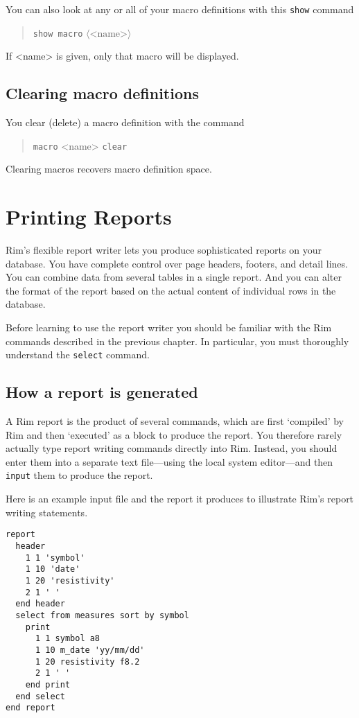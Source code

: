 \documentclass[11pt,a4paper]{report}
\def\opt#1{$\langle \mbox{#1} \rangle$}
\def\I{\index}
\begin{document}
You can also look at any or all of your macro definitions
with this \verb!show! command
\begin{verse}
  \verb!show macro! \opt{<name>}
\end{verse}
If <name> is given, only that macro will be displayed.
 
\section{Clearing macro definitions}
You clear (delete) a macro definition with the command
\begin{verse}
  \verb!macro! <name> \verb!clear!
\end{verse}
Clearing macros recovers macro definition space.
\I{macros|)}

 
%
%
\def\demobreak{\par\pagebreak[3]\bigskip}

%
\chapter{Printing Reports}
%
\label{report-writer}
\I{Reports|(}
Rim's flexible report writer lets you produce
sophisticated reports on your database.
You have complete control over page headers, footers,
and detail lines.  You can combine data from several tables
in a single report. And you can alter the format of the
report based on the actual content of individual rows
in the database.
 
Before learning to use the report writer you should be
familiar with the Rim commands described in the previous chapter.
In particular, you must
thoroughly understand the \verb!select! command.
 
\section{How a report is generated}
%
A Rim report is the product of several commands, which are first
`compiled' by Rim and then `executed' as a block to produce the report.
You therefore rarely actually type report writing commands
directly into Rim.  Instead, you should enter them into a separate
text file---using the local system editor---and then \verb!input! them
to produce the report.
\I{input@"input"}
 
 
Here is an example input file and the report it produces to
illustrate Rim's report writing statements.
\demobreak
\begin{verbatim}
report
  header
    1 1 'symbol'
    1 10 'date'
    1 20 'resistivity'
    2 1 ' '
  end header
  select from measures sort by symbol
    print
      1 1 symbol a8
      1 10 m_date 'yy/mm/dd'
      1 20 resistivity f8.2
      2 1 ' '
    end print
  end select
end report
\end{verbatim}
 
\end{document}
